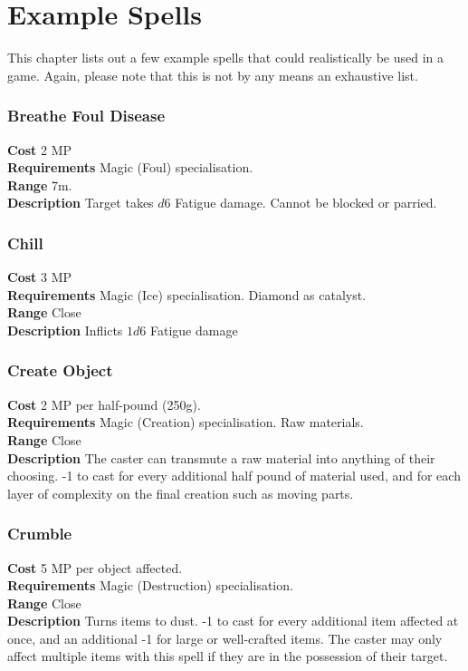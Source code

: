 \chapter{Example Spells}
This chapter lists out a few example spells that could realistically be used in a game.
Again, please note that this is not by any means an exhaustive list.

\subsection*{Breathe Foul Disease}
\textbf{Cost} 2 MP\\
\textbf{Requirements} Magic (Foul) specialisation. \\
\textbf{Range} 7m. \\
\textbf{Description} Target takes $d6$ Fatigue damage. 
Cannot be blocked or parried.

\subsection*{Chill}
\textbf{Cost} 3 MP\\
\textbf{Requirements} Magic (Ice) specialisation. 
Diamond as catalyst. \\
\textbf{Range} Close\\
\textbf{Description} Inflicts $1d6$ Fatigue damage

\subsection*{Create Object}
\textbf{Cost} 2 MP per half-pound (250g).\\
\textbf{Requirements} Magic (Creation) specialisation. Raw materials.\\
\textbf{Range} Close\\
\textbf{Description} The caster can transmute a raw material into anything of their choosing. 
-1 to cast for every additional half pound of material used, and for each layer of complexity on the final creation such as moving parts.

\subsection*{Crumble}
\textbf{Cost} 5 MP per object affected.\\
\textbf{Requirements} Magic (Destruction) specialisation.\\
\textbf{Range} Close\\
\textbf{Description} Turns items to dust. 
-1 to cast for every additional item affected at once, and an additional -1 for large or well-crafted items.
The caster may only affect multiple items with this spell if they are in the possession of their target.


